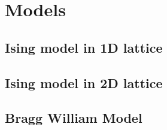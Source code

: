 \section{Models}
	\subsection{Ising model in 1D lattice}
	\subsection{Ising model in 2D lattice}
	\subsection{Bragg William Model}
